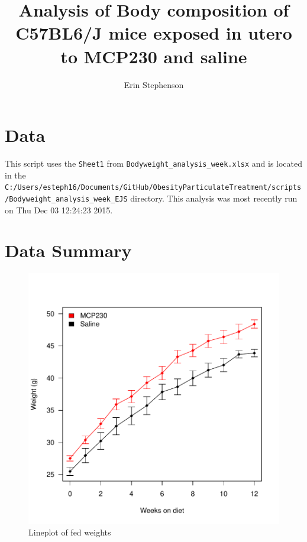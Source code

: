 \documentclass{article}
\begin{document}


\title{Analysis of Body composition of C57BL6/J mice exposed in utero to MCP230 and saline}
\author{Erin Stephenson}
\date{\toWeek}
\maketitle

\section*{Data}
This script uses the \verb+Sheet1+ from \verb+Bodyweight_analysis_week.xlsx+ and is located in the \verb+C:/Users/esteph16/Documents/GitHub/ObesityParticulateTreatment/scripts/Bodyweight_analysis_week_EJS+ directory.  This analysis was most recently run on Thu Dec 03 12:24:23 2015.  

\section*{Data Summary}

\begin{figure}
\begin{center}
\includegraphics{Body_weight_figure_EJS-lineplotWeight}
\end{center}
\caption{Lineplot of fed weights}
\label{fig:lineplotweight}
\end{figure}
\end{document}
